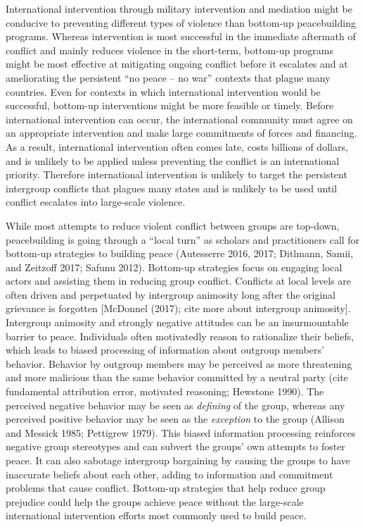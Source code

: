 \documentclass[11pt]{article}
\begin{document}
International intervention through military intervention and mediation
might be conducive to preventing different types of violence than
bottom-up peacebuilding programs. Whereas intervention is most
successful in the immediate aftermath of conflict and mainly reduces
violence in the short-term, bottom-up programs might be most effective
at mitigating ongoing conflict before it escalates and at ameliorating
the persistent ``no peace -- no war'' contexts that plague many
countries. Even for contexts in which international intervention would
be successful, bottom-up interventions might be more feasible or timely.
Before international intervention can occur, the international community
must agree on an appropriate intervention and make large commitments of
forces and financing. As a result, international intervention often
comes late, costs billions of dollars, and is unlikely to be applied
unless preventing the conflict is an international priority. Therefore
international intervention is unlikely to target the persistent
intergroup conflicts that plagues many states and is unlikely to be used
until conflict escalates into large-scale violence.

While most attempts to reduce violent conflict between groups are
top-down, peacebuilding is going through a ``local turn'' as scholars
and practitioners call for bottom-up strategies to building peace
(Autesserre 2016, 2017; Ditlmann, Samii, and Zeitzoff 2017; Safunu
2012). Bottom-up strategies focus on engaging local actors and assisting
them in reducing group conflict. Conflicts at local levels are often
driven and perpetuated by intergroup animosity long after the original
grievance is forgotten {[}McDonnel (2017); cite more about intergroup
animosity{]}. Intergroup animosity and strongly negative attitudes can
be an insurmountable barrier to peace. Individuals often motivatedly
reason to rationalize their beliefs, which leads to biased processing of
information about outgroup members' behavior. Behavior by outgroup
members may be perceived as more threatening and more malicious than the
same behavior committed by a neutral party (cite fundamental attribution
error, motivated reasoning; Hewstone 1990). The perceived negative
behavior may be seen as \emph{defining} of the group, whereas any
perceived positive behavior may be seen as the \emph{exception} to the
group (Allison and Messick 1985; Pettigrew 1979). This biased
information processing reinforces negative group stereotypes and can
subvert the groups' own attempts to foster peace. It can also sabotage
intergroup bargaining by causing the groups to have inaccurate beliefs
about each other, adding to information and commitment problems that
cause conflict. Bottom-up strategies that help reduce group prejudice
could help the groups achieve peace without the large-scale
international intervention efforts most commonly used to build peace.
\end{document}
